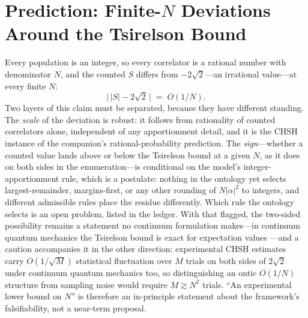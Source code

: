 \documentclass[11pt]{article}
\theoremstyle{definition}
\theoremstyle{remark}
\begin{document}
\section{Prediction: Finite-$N$ Deviations Around the Tsirelson Bound}\label{sec:pred}
Every population is an integer, so every correlator is a rational number with denominator $N$, and the counted $S$ differs from $-2\sqrt{2}$---an irrational value---at every finite $N$:
\[ \big|\,|S| - 2\sqrt{2}\,\big| \;=\; O(1/N). \]
Two layers of this claim must be separated, because they have different standing. The \emph{scale} of the deviation is robust: it follows from rationality of counted correlators alone, independent of any apportionment detail, and it is the CHSH instance of the companion's rational-probability prediction. The \emph{sign}---whether a counted value lands above or below the Tsirelson bound at a given $N$, as it does on both sides in the enumeration---is conditional on the model's integer-apportionment rule, which is a postulate: nothing in the ontology yet selects largest-remainder, margins-first, or any other rounding of $N|\alpha|^2$ to integers, and different admissible rules place the residue differently. Which rule the ontology selects is an open problem, listed in the ledger. With that flagged, the two-sided possibility remains a statement no continuum formulation makes---in continuum quantum mechanics the Tsirelson bound is exact for expectation values \cite{Tsirelson1980}---and a caution accompanies it in the other direction: experimental CHSH estimates carry $O(1/\sqrt{M})$ statistical fluctuation over $M$ trials on both sides of $2\sqrt{2}$ under continuum quantum mechanics too, so distinguishing an ontic $O(1/N)$ structure from sampling noise would require $M \gtrsim N^2$ trials. ``An experimental lower bound on $N$'' is therefore an in-principle statement about the framework's falsifiability, not a near-term proposal.
\end{document}
